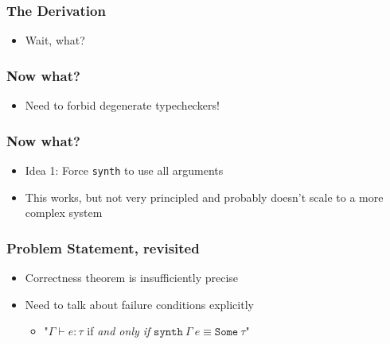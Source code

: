 \documentclass[usenames,dvipsnames]{beamer}
\newcommand{\synth}{\texttt{synth}}
\begin{document}

{
  \begin{frame}
    \frametitle{The Derivation}

    \begin{itemize}
      \item Wait, what?
    \end{itemize}
  \end{frame}
}


\begin{frame}
  \frametitle{Now what?}

  \begin{itemize}
    \item Need to forbid degenerate typecheckers!
  \end{itemize}
\end{frame}


\begin{frame}
  \frametitle{Now what?}

  \begin{itemize}
    \item Idea 1: Force \synth{} to use all arguments
    \item This works, but not very principled and probably doesn't scale to a
      more complex system
  \end{itemize}
\end{frame}


\begin{frame}
  \frametitle{Problem Statement, revisited}

  \begin{itemize}
    \item Correctness theorem is insufficiently precise
    \item Need to talk about failure conditions explicitly
      \begin{itemize}
        \item "$\Gamma \vdash e : \tau$ if \emph{and only if} $\synth
          \ \Gamma\ e \equiv \texttt{Some}\ \tau$"
      \end{itemize}
  \end{itemize}
\end{frame}
\end{document}
